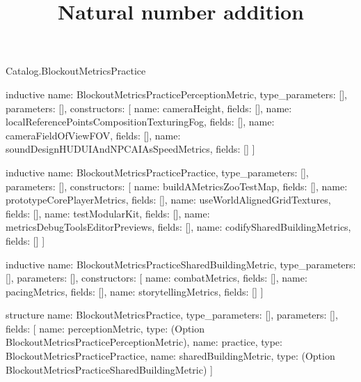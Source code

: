 \begin{lexlean}{Catalog.BlockoutMetricsPractice}
\title{Natural number addition}
\begin{semanticmodule}
inductive{
  name: BlockoutMetricsPracticePerceptionMetric,
  type_parameters: [],
  parameters: [],
  constructors: [
    {name: cameraHeight, fields: []},
    {name: localReferencePointsCompositionTexturingFog, fields: []},
    {name: cameraFieldOfViewFOV, fields: []},
    {name: soundDesignHUDUIAndNPCAIAsSpeedMetrics, fields: []}
  ]
}

inductive{
  name: BlockoutMetricsPracticePractice,
  type_parameters: [],
  parameters: [],
  constructors: [
    {name: buildAMetricsZooTestMap, fields: []},
    {name: prototypeCorePlayerMetrics, fields: []},
    {name: useWorldAlignedGridTextures, fields: []},
    {name: testModularKit, fields: []},
    {name: metricsDebugToolsEditorPreviews, fields: []},
    {name: codifySharedBuildingMetrics, fields: []}
  ]
}

inductive{
  name: BlockoutMetricsPracticeSharedBuildingMetric,
  type_parameters: [],
  parameters: [],
  constructors: [
    {name: combatMetrics, fields: []},
    {name: pacingMetrics, fields: []},
    {name: storytellingMetrics, fields: []}
  ]
}

structure{
  name: BlockoutMetricsPractice,
  type_parameters: [],
  parameters: [],
  fields: [
    {name: perceptionMetric, type: (Option BlockoutMetricsPracticePerceptionMetric)},
    {name: practice, type: BlockoutMetricsPracticePractice},
    {name: sharedBuildingMetric, type: (Option BlockoutMetricsPracticeSharedBuildingMetric)}
  ]
}
\end{semanticmodule}
\end{lexlean}
